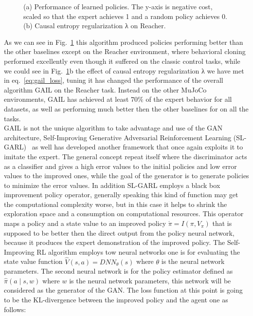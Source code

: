 \begin{figure}
	\centerline
	\GAILExperiments
	\caption{(a) Performance of learned policies. The y-axis is negative cost, scaled so that the expert achieves 1 and a random policy achieves 0. (b) Causal entropy regularization λ on Reacher.}
	\label{fig:GAILExperiments}
\end{figure}
As we can see in Fig.~\ref{fig:GAILExperiments} this algorithm produced policies performing better than the other baselines except on the Reacher environment, where behavioral cloning performed excellently even though it suffered on the classic control tasks, while we could see in Fig.~\ref{fig:GAILExperiments}b the effect of causal entropy regularization λ we have met in eq.~\ref{eq:gail_loss}, tuning it has changed the performance of the overall algorithm GAIL on the Reacher task. Instead on the other MuJoCo environments, GAIL has achieved at least $70\%$ of the expert behavior for all datasets, as well as performing much better then the other baselines for on all the tasks.\\
GAIL is not the unique algorithm to take advantage and use of the GAN architecture, Self-Improving Generative Adversarial Reinforcement Learning (SL-GARL)~\cite{liu2019self} as well has developed another framework that once again exploits it to imitate the expert. The general concept repeat itself where the discriminator acts as a classifier and gives a high error values to the initial policies and low error values to the improved ones, while the goal of the generator is to generate policies to minimize the error values. In addition SL-GARL employs a black box improvement policy operator, generally speaking this kind of function may get the computational complexity worse, but in this case it helps to shrink the exploration space and a consumption on computational resources. This operator maps a policy and a state value to an improved policy $ \acute{\pi} = I(\pi, V_\pi)$ that is supposed to be better then the direct output from the policy neural network, because it produces the expert demonstration of the improved policy. The Self-Improving RL algorithm employs tow neural networks one is for evaluating the state value function  $\hat{V}(s,a)=DNN_\theta(s)$ where $\theta$ is the neural network parameters. The second neural network is for the policy estimator defined as $\hat{\pi}(a \mid s,w)$ where $w$ is the neural network parameters, this network will be considered as the generator of the GAN. The loss function at this point is going to be the KL-divergence between the improved policy and the agent one as follows:
